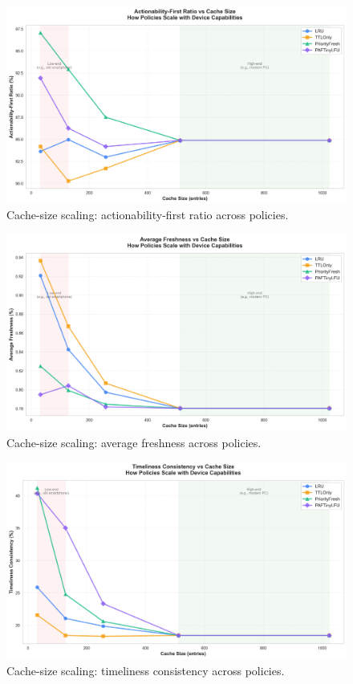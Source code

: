 \documentclass[11pt,twocolumn]{article}
\begin{document}
\begin{figure}[h]
    \centering
    \includegraphics[width=\linewidth]{figures/device_scaling_actionabilityFirstRatio.png}
    \caption{Cache-size scaling: actionability-first ratio across policies.}
    \label{fig:device-scaling-actionability}
\end{figure}

\begin{figure}[h]
    \centering
    \includegraphics[width=\linewidth]{figures/device_scaling_avgFreshness.png}
    \caption{Cache-size scaling: average freshness across policies.}
    \label{fig:device-scaling-freshness}
\end{figure}

\begin{figure}[h]
    \centering
    \includegraphics[width=\linewidth]{figures/device_scaling_timelinessConsistency.png}
    \caption{Cache-size scaling: timeliness consistency across policies.}
    \label{fig:device-scaling-timeliness}
\end{figure}
\end{document}
